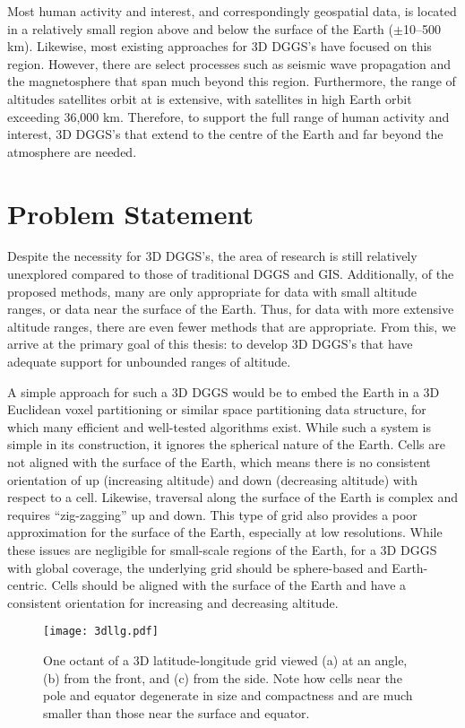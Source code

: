 Most human activity and interest, and correspondingly geospatial data, is located in a relatively small region above and below the surface of the Earth ($\pm$10--500 km).
Likewise, most existing approaches for 3D DGGS's have focused on this region.
However, there are select processes such as seismic wave propagation and the magnetosphere that span much beyond this region.
Furthermore, the range of altitudes satellites orbit at is extensive, with satellites in high Earth orbit exceeding 36,000 km.
Therefore, to support the full range of human activity and interest, 3D DGGS's that extend to the centre of the Earth and far beyond the atmosphere are needed.


\section{Problem Statement} \label{chap:1:problem}
Despite the necessity for 3D DGGS's, the area of research is still relatively unexplored compared to those of traditional DGGS and GIS.
Additionally, of the proposed methods, many are only appropriate for data with small altitude ranges, or data near the surface of the Earth.
Thus, for data with more extensive altitude ranges, there are even fewer methods that are appropriate. 
From this, we arrive at the primary goal of this thesis: to develop 3D DGGS's that have adequate support for unbounded ranges of altitude. 


A simple approach for such a 3D DGGS would be to embed the Earth in a 3D Euclidean voxel partitioning or similar space partitioning data structure, for which many efficient and well-tested algorithms exist.
While such a system is simple in its construction, it ignores the spherical nature of the Earth.
Cells are not aligned with the surface of the Earth, which means there is no consistent orientation of up (increasing altitude) and down (decreasing altitude) with respect to a cell.
Likewise, traversal along the surface of the Earth is complex and requires ``zig-zagging'' up and down.
This type of grid also provides a poor approximation for the surface of the Earth, especially at low resolutions.
While these issues are negligible for small-scale regions of the Earth, for a 3D DGGS with global coverage, the underlying grid should be sphere-based and Earth-centric.
Cells should be aligned with the surface of the Earth and have a consistent orientation for increasing and decreasing altitude.


\begin{figure}[htb!]
	\centering
	\texttt{[image: 3dllg.pdf]}
	\caption[Different views of a 3D latitude-longitude grid]{
		One octant of a 3D latitude-longitude grid viewed (a) at an angle, (b) from the front, and (c) from the side.
		Note how cells near the pole and equator degenerate in size and compactness and are much smaller than those near the surface and equator.
	}
	\label{fig:3dllg}
\end{figure}


